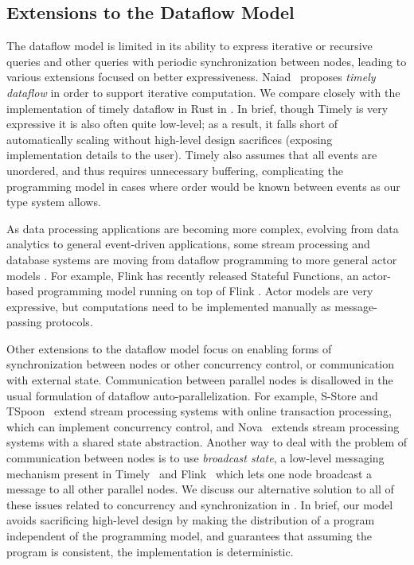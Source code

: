 \subsection{Extensions to the Dataflow Model}

The dataflow model is limited in its ability to express iterative or recursive queries and other queries with periodic synchronization between nodes, leading to various extensions focused on better expressiveness.
Naiad~\cite{Naiad2013,Timely} proposes \emph{timely dataflow} in order
to support iterative computation.
We compare closely with the implementation of timely dataflow in Rust in .
In brief, though Timely is very expressive it is also often quite low-level; as a result, it falls short of automatically scaling without high-level design sacrifices (exposing implementation details to the user).
Timely also assumes that all events are unordered, and thus requires unnecessary buffering, complicating the programming model in cases where order would be known between events as our type system allows.

As data processing applications are becoming more complex, evolving from
data analytics to general event-driven applications, some stream
processing and database systems are moving from dataflow programming to more
general actor models
\cite{CarboneFKK20,Bernstein19,BernsteinDKM17,Das2018,xu2021move}.
For example, Flink has recently released Stateful Functions,
an actor-based programming model running on top of Flink
\cite{AkhterFK19,StatefulFunctions}.
Actor models are very expressive, but computations need to be implemented manually as
message-passing protocols.

Other extensions to the dataflow model focus on enabling forms of synchronization between nodes or other concurrency control, or communication with external state.
Communication between parallel nodes is disallowed in the usual formulation of dataflow auto-parallelization.
For example, S-Store and TSpoon~\cite{meehan2015s,affetti2020tspoon} extend stream processing systems with online transaction processing, which can implement concurrency control,
and Nova~\cite{zhao2021timestamped} extends stream processing systems with a shared state abstraction.
Another way to deal with the problem of communication between nodes
is to use \emph{broadcast state}, a low-level messaging mechanism present in
Timely~\cite{BroadcastStateTimely} and Flink~\cite{BroadcastStateFlink}
which lets one node broadcast a message to all other parallel nodes.
We discuss our alternative solution to all of these issues related to concurrency and synchronization in .
In brief, our model avoids sacrificing high-level design by making the distribution of a program independent of the programming model, and guarantees that assuming the program is consistent, the implementation is deterministic.

